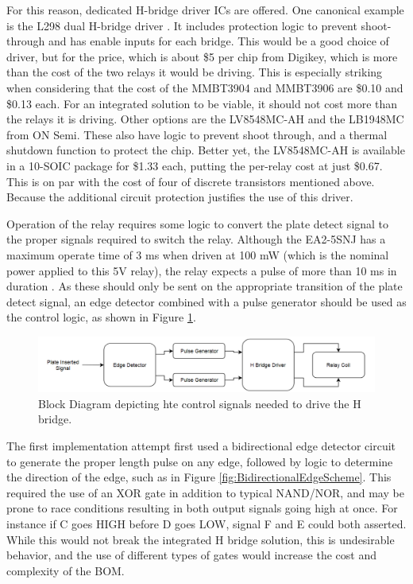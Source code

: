 \documentclass{article}
\begin{document}
		For this reason, dedicated H-bridge driver ICs are offered.  One canonical example is the L298 dual H-bridge driver \cite{L298datasheet}.  It includes protection logic to prevent shoot-through and has enable inputs for each bridge.  This would be a good choice of driver, but for the price, which is about \$5 per chip from Digikey, which is more than the cost of the two relays it would be driving.  This is especially striking when considering that the cost of the MMBT3904 and MMBT3906 are \$0.10 and \$0.13 each.  For an integrated solution to be viable, it should not cost more than the relays it is driving.  Other options are the LV8548MC-AH \cite{LV8548MCdatasheet} and the LB1948MC \cite{LB1948MCdatasheet} from ON Semi.  These also have logic to prevent shoot through, and a thermal shutdown function to protect the chip.  Better yet, the LV8548MC-AH is available in a 10-SOIC package for \$1.33 each, putting the per-relay cost at just \$0.67.  This is on par with the cost of four of discrete transistors mentioned above.  Because the additional circuit protection justifies the use of this driver.

		Operation of the relay requires some logic to convert the plate detect signal to the proper signals required to switch the relay.  Although the EA2-5SNJ has a maximum operate time of 3 ms when driven at 100 mW (which is the nominal power applied to this 5V relay), the relay expects a pulse of more than 10 ms in duration \cite{EA2datasheet}.  As these should only be sent on the appropriate transition of the plate detect signal, an edge detector combined with a pulse generator should be used as the control logic, as shown in Figure \ref{fig:HBridgeCTRL_Block}.

		\begin{figure}
			\centering
			\includegraphics[width = \textwidth]{PR2Images/HBridgeCTRL_Block.PNG}
			\caption{Block Diagram depicting hte control signals needed to drive the H bridge.}
			\label{fig:HBridgeCTRL_Block}
		\end{figure}

		The first implementation attempt first used a bidirectional edge detector circuit to generate the proper length pulse on any edge, followed by logic to determine the direction of the edge, such as in Figure \ref{fig:BidirectionalEdgeScheme}.  This required the use of an XOR gate in addition to typical NAND/NOR, and may be prone to race conditions resulting in both output signals going high at once.  For instance if C goes HIGH before D goes LOW, signal F and E could both asserted.  While this would not break the integrated H bridge solution, this is undesirable behavior, and the use of different types of gates would increase the cost and complexity of the BOM.
\end{document}
